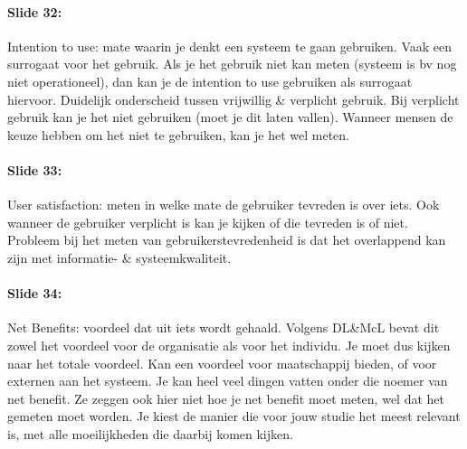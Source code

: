 \documentclass[10pt,a4paper]{report}
\begin{document}
\paragraph{Slide 32:}Intention to use: mate waarin je denkt een systeem te gaan gebruiken. Vaak een surrogaat voor het gebruik. Als je het gebruik niet kan meten (systeem is bv nog niet operationeel), dan kan je de intention to use gebruiken als surrogaat hiervoor. Duidelijk onderscheid tussen vrijwillig \& verplicht gebruik. Bij verplicht gebruik kan je het niet gebruiken (moet je dit laten vallen). Wanneer mensen de keuze hebben om het niet te gebruiken, kan je het wel meten.

\paragraph{Slide 33:}User satisfaction: meten in welke mate de gebruiker tevreden is over iets. Ook wanneer de gebruiker verplicht is kan je kijken of die tevreden is of niet. Probleem bij het meten van gebruikerstevredenheid is dat het overlappend kan zijn met informatie- \& systeemkwaliteit.

\paragraph{Slide 34:}Net Benefits: voordeel dat uit iets wordt gehaald. Volgens DL\&McL bevat dit zowel het voordeel voor de organisatie als voor het individu. Je moet dus kijken naar het totale voordeel. 
Kan een voordeel voor maatschappij bieden, of voor externen aan het systeem. Je kan heel veel dingen vatten onder die noemer van net benefit. Ze zeggen ook hier niet hoe je net benefit moet meten, wel dat het gemeten moet worden. Je kiest de manier die voor jouw studie het meest relevant is, met alle moeilijkheden die daarbij komen kijken.
\end{document}
